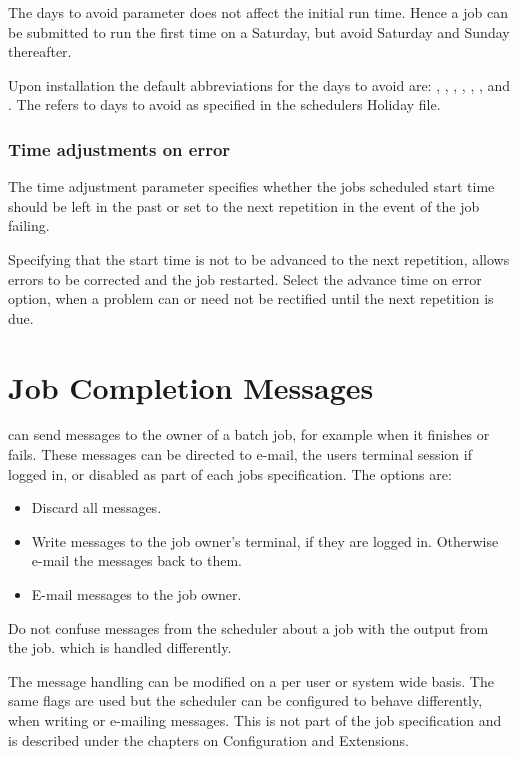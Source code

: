 The days to avoid parameter does not affect the initial run time. Hence a job can be submitted to run the first time on a Saturday, but avoid
Saturday and Sunday thereafter.

Upon installation the default abbreviations for the days to avoid are: , ,
, , , ,  and . The
 refers to days to avoid as specified in the scheduler{\textquotesingle}s Holiday file.

\subsubsection{Time adjustments on error}
The time adjustment parameter specifies whether the job{\textquotesingle}s scheduled start time should be left in the past
or set to the next repetition in the event of the job failing.

Specifying that the start time is not to be advanced to the next repetition, allows errors to be corrected and the job restarted. Select
the advance time on error option, when a problem can or need not be rectified until the next repetition is due.

\section{Job Completion Messages}
\ProductName{} can send messages to the owner of a batch job, for example when it finishes or fails. These messages can be directed to e-mail, the
users terminal session if logged in, or disabled as part of each jobs specification. The options are:

\begin{itemize}
\item Discard all messages.
\item Write messages to the job owner's terminal, if they are logged in. Otherwise e-mail the messages back to them.
\item E-mail messages to the job owner.
\end{itemize}
Do not confuse messages from the scheduler about a job with the output from the job. which is handled differently.

The message handling can be modified on a per user or system wide basis. The same flags are used but the scheduler can be configured to behave
differently, when writing or e-mailing messages. This is not part of the job specification and is described under the chapters on
Configuration and Extensions.

